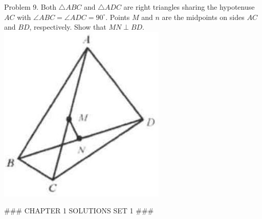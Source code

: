 \documentclass[10pt]{article}
\begin{document}
Problem 9. Both \(\triangle A B C\) and \(\triangle A D C\) are right triangles sharing the hypotenuse \(A C\) with \(\angle A B C=\angle A D C=90^{\circ}\). Points \(M\) and \(n\) are the midpoints on sides \(A C\) and \(B D\), respectively. Show that \(M N \perp B D\).\\
\includegraphics[max width=\textwidth, center]{2025_04_17_97bc1f7e44d93c271a88g-016(3)}


### CHAPTER 1 SOLUTIONS SET 1 ###
\end{document}
